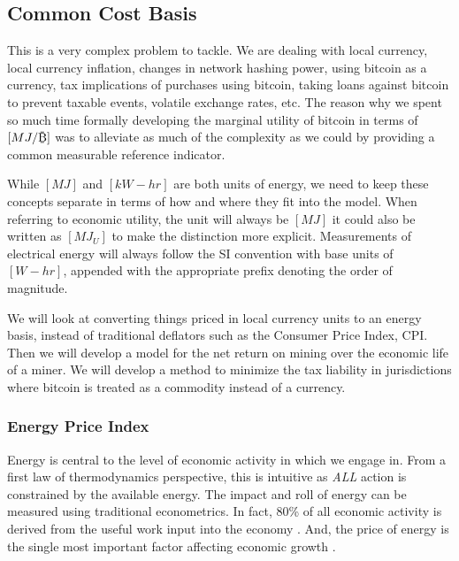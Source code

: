 \documentclass[runningheads]{llncs}
\def\bitcoin{
    \leavevmode
    \vtop{\offinterlineskip %
    \setbox0=\hbox{B}
    \setbox2=\hbox to\wd0{\hfil\hskip-.03em
    \vrule height .3ex width .15ex\hskip .08em
    \vrule height .3ex width .15ex\hfil}
    \vbox{\copy2\box0}\box2}
}
\begin{document}
\subsection{Common Cost Basis}
This is a very complex problem to tackle.
We are dealing with local currency, local currency inflation, changes in network hashing power, using bitcoin as a currency, tax implications of purchases using bitcoin, taking loans against bitcoin to prevent taxable events, volatile exchange rates, etc.
The reason why we spent so much time formally developing the marginal utility of bitcoin in terms of $[MJ/\bitcoin]$ was to alleviate as much of the complexity as we could by providing a common measurable reference indicator.

While $[MJ]$ and $[kW-hr]$ are both units of energy, we need to keep these concepts separate in terms of how and where they fit into the model.
When referring to economic utility, the unit will always be $[MJ]$ it could also be written as $[MJ_U]$ to make the distinction more explicit.
Measurements of electrical energy will always follow the SI convention with base units of $[W-hr]$, appended with the appropriate prefix denoting the order of magnitude.

We will look at converting things priced in local currency units to an energy basis, instead of traditional deflators such as the Consumer Price Index, CPI.
Then we will develop a model for the net return on mining over the economic life of a miner.
We will develop a method to minimize the tax liability in jurisdictions where bitcoin is treated as a commodity instead of a currency.

\subsubsection{Energy Price Index}
Energy is central to the level of economic activity in which we engage in.
From a first law of thermodynamics perspective, this is intuitive as \emph{ALL} action is constrained by the available energy.
The impact and roll of energy can be measured using traditional econometrics.
In fact, 80\% of all economic activity is derived from the useful work input into the economy \cite{ayers2009engine}.
And, the price of energy is the single most important factor affecting economic growth \cite{ayers2009engine}.
\end{document}
